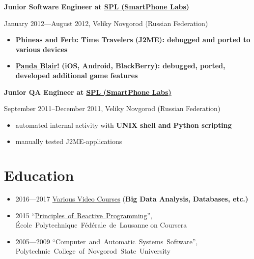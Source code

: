 \vspace{0.5cm}

{
\fontsize{12pt}{12pt}\selectfont
\bfseries Junior Software Engineer at
\href{http://spl.co}{\bfseries SPL (SmartPhone Labs)\mdseries}
\mdseries
}

{
\fontsize{9pt}{8pt}\selectfont
January 2012---August 2012, Veliky Novgorod (Russian Federation)
}

\begin{itemize}[rightmargin=\dimexpr\linewidth-18cm-\leftmargin\relax]
\item
    \href{http://java.mob.org/game/phineas\_and\_ferb\_time\_travelers.html}
        {\bfseries Phineas and Ferb: Time Travelers\mdseries}
        \bfseries (J2ME)\mdseries:
        debugged and ported to various devices
\item
    \href{https://itunes.apple.com/us/app/panda-blair!/id500995558?mt=8}
        {\bfseries Panda Blair!\mdseries}
        \bfseries (iOS, Android, BlackBerry)\mdseries: debugged, ported, developed additional game features
\end{itemize}

\vspace{0.5cm}

{
\fontsize{12pt}{12pt}\selectfont
\bfseries Junior QA Engineer at
\href{http://spl.co}{\bfseries SPL (SmartPhone Labs)\mdseries}
\mdseries
}

{
\fontsize{9pt}{8pt}\selectfont
September 2011--December 2011, Veliky Novgorod (Russian Federation)
}

\begin{itemize}[rightmargin=\dimexpr\linewidth-17cm-\leftmargin\relax]
    \item automated internal activity with \bfseries UNIX shell \mdseries and \bfseries Python \mdseries scripting
    \item manually tested J2ME-applications
\end{itemize}

\section*{Education}
\begin{itemize}
    \item 2016---2017 \href{https://alopatindev.github.io/2016/11/29/self-learning}{Various Video Courses} (\bfseries Big Data \mdseries Analysis, Databases, etc.)
    \item 2015 ``\href{https://www.coursera.org/account/accomplishments/verify/UJJ99REEZY}{Principles~of~Reactive~Programming}'', École~Polytechnique~Fédérale~de~Lausanne on Coursera
    \item 2005---2009 ``Computer~and~Automatic~Systems~Software'', Polytechnic~College~of~Novgorod~State~University
\end{itemize}

